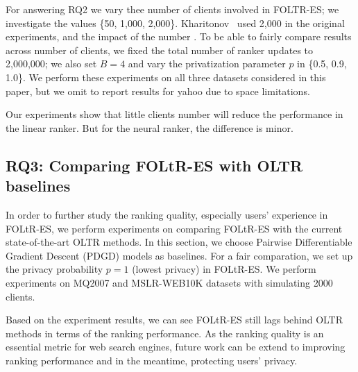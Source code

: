 For answering RQ2 we vary thee number of clients involved in FOLTR-ES; we investigate the values \{50, 1,000, 2,000\}. Kharitonov~\cite{kharitonov2019federated} used 2,000 in the original experiments, and the impact of the number . To be able to fairly compare results across number of clients, we fixed the total number of ranker updates to 2,000,000; we also set $B = 4$ and vary the privatization parameter $p$ in \{0.5, 0.9, 1.0\}. We perform these experiments on all three datasets considered in this paper, but we omit to report results for yahoo due to space limitations. 



Our experiments show that little clients number will reduce the performance in the linear ranker. But for the neural ranker, the difference is minor.


\subsection{RQ3: Comparing FOLtR-ES with OLTR baselines}

In order to further study the ranking quality, especially users' experience in FOLtR-ES, we perform experiments on comparing FOLtR-ES with the current state-of-the-art OLTR methods. In this section, we choose Pairwise Differentiable Gradient Descent (PDGD) models as baselines. For a fair comparation, we set up the privacy probability $p = 1$ (lowest privacy) in FOLtR-ES. We perform experiments on MQ2007 and MSLR-WEB10K datasets with simulating 2000 clients.

Based on the experiment results, we can see FOLtR-ES still lags behind OLTR methods in terms of the ranking performance. As the ranking quality is an essential metric for web search engines, future work can be extend to improving ranking performance and in the meantime, protecting users' privacy.

